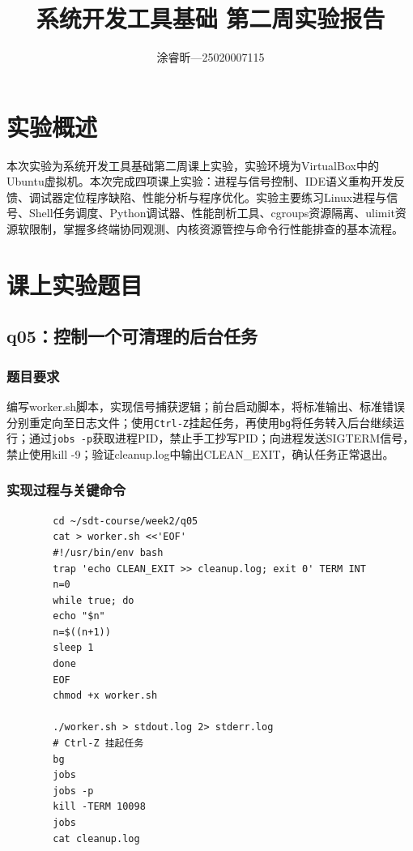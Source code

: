 \documentclass[a4paper,12pt]{ctexart}
\begin{document}
	
	\title{系统开发工具基础 第二周实验报告}
	\author{涂睿昕---25020007115}
	\maketitle
	
	\section{实验概述}
	 本次实验为系统开发工具基础第二周课上实验，实验环境为VirtualBox中的Ubuntu虚拟机。本次完成四项课上实验：进程与信号控制、IDE语义重构开发反馈、调试器定位程序缺陷、性能分析与程序优化。实验主要练习Linux进程与信号、Shell任务调度、Python调试器、性能剖析工具、cgroups资源隔离、ulimit资源软限制，掌握多终端协同观测、内核资源管控与命令行性能排查的基本流程。
	
	\section{课上实验题目}
	\subsection{q05：控制一个可清理的后台任务}
	\subsubsection{题目要求}
     编写worker.sh脚本，实现信号捕获逻辑；前台启动脚本，将标准输出、标准错误分别重定向至日志文件；使用\texttt{Ctrl‑Z}挂起任务，再使用\texttt{bg}将任务转入后台继续运行；通过\texttt{jobs -p}获取进程PID，禁止手工抄写PID；向进程发送SIGTERM信号，禁止使用kill -9；验证cleanup.log中输出CLEAN\_EXIT，确认任务正常退出。
	
	\subsubsection{实现过程与关键命令}
	\begin{lstlisting}
		cd ~/sdt-course/week2/q05
		cat > worker.sh <<'EOF'
		#!/usr/bin/env bash
		trap 'echo CLEAN_EXIT >> cleanup.log; exit 0' TERM INT
		n=0
		while true; do
		echo "$n"
		n=$((n+1))
		sleep 1
		done
		EOF
		chmod +x worker.sh
		
		./worker.sh > stdout.log 2> stderr.log
		# Ctrl‑Z 挂起任务
		bg
		jobs
		jobs -p
		kill -TERM 10098
		jobs
		cat cleanup.log
	\end{lstlisting}
	
\end{document}
